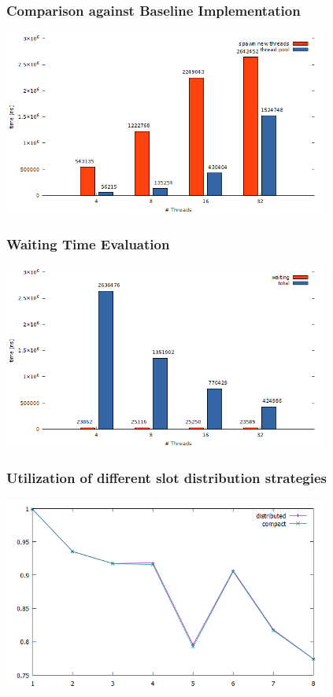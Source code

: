 \documentclass{beamer}
\begin{document}
\begin{frame}
	\frametitle{Comparison against Baseline Implementation}
	\begin{center}
		\includegraphics[width=0.8\textwidth]{img/pool_baseline.png}
	\end{center}
	
\end{frame}

\begin{frame}
	\frametitle{Waiting Time Evaluation}
	\begin{center}
		\includegraphics[width=0.8\textwidth]{img/pool_avg.png}
	\end{center}

\end{frame}

\begin{frame}
	\frametitle{Utilization of different slot distribution strategies}
	\begin{center}
		\includegraphics[width=0.8\textwidth]{img/slot_distr.png}
	\end{center}
\end{frame}
\end{document}
